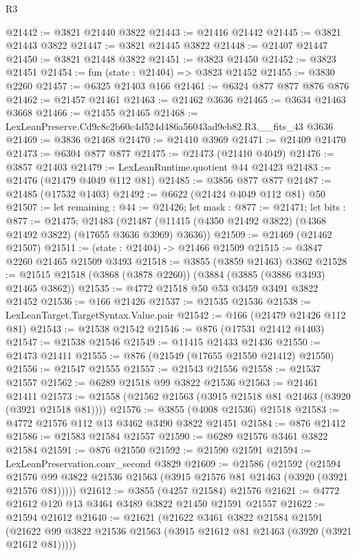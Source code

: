 \begin{lexlean}{R3}
\begin{coremodule}
@21442 := @3821 @21440 @3822
@21443 := @21416 @21442
@21445 := @3821 @21443 @3822
@21447 := @3821 @21445 @3822
@21448 := @21407 @21447
@21450 := @3821 @21448 @3822
@21451 := @3823 @21450
@21452 := @3823 @21451
@21454 := fun (state : @21404) => @3823 @21452
@21455 := @3830 @2260
@21457 := @6325 @21403 @166
@21461 := @6324 @877 @877 @876 @876
@21462 := @21457 @21461
@21463 := @21462 @3636
@21465 := @3634 @21463 @3668
@21466 := @21455 @21465
@21468 := LexLeanPreserve.Cd9c8c2b60c4d524d486a56043ad9eb82.R3.__fits_43 @3636
@21469 := @3836 @21468
@21470 := @21410 @3969
@21471 := @21409 @21470
@21473 := @6304 @877 @877
@21475 := @21473 (@21410 @4049)
@21476 := @3857 @21403
@21479 := LexLeanRuntime.quotient @44 @21423
@21483 := @21476 (@21479 @4049 @112 @81)
@21485 := @3856 @877 @877
@21487 := @21485 (@17532 @1403)
@21492 := @6622 (@21424 @4049 @112 @81) @50
@21507 := let remaining : @44 := @21426;
  let mask : @877 := @21471;
  let bits : @877 := @21475;
  @21483 (@21487 (@11415 (@4350 @21492 @3822) (@4368 @21492 @3822) (@17655 @3636 @3969) @3636))
@21509 := @21469 (@21462 @21507)
@21511 := (state : @21404) -> @21466 @21509
@21515 := @3847 @2260 @21465 @21509 @3493
@21518 := @3855 (@3859 @21463) @3862
@21528 := @21515 @21518 (@3868 (@3878 @2260)) (@3884 (@3885 (@3886 @3493) @21465 @3862))
@21535 := @4772 @21518 @50 @53 @3459 @3491 @3822 @21452
@21536 := @166 @21426
@21537 := @21535 @21536
@21538 := LexLeanTarget.TargetSyntax.Value.pair
@21542 := @166 (@21479 @21426 @112 @81)
@21543 := @21538 @21542
@21546 := @876 (@17531 @21412 @1403)
@21547 := @21538 @21546
@21549 := @11415 @21433 @21436
@21550 := @21473 @21411
@21555 := @876 (@21549 (@17655 @21550 @21412) @21550)
@21556 := @21547 @21555
@21557 := @21543 @21556
@21558 := @21537 @21557
@21562 := @6289 @21518 @99 @3822 @21536
@21563 := @21461 @21411
@21573 := @21558 (@21562 @21563 (@3915 @21518 @81 @21463 (@3920 (@3921 @21518 @81))))
@21576 := @3855 (@4008 @21536) @21518
@21583 := @4772 @21576 @112 @13 @3462 @3490 @3822 @21451
@21584 := @876 @21412
@21586 := @21583 @21584 @21557
@21590 := @6289 @21576 @3461 @3822 @21584
@21591 := @876 @21550
@21592 := @21590 @21591
@21594 := LexLeanPreservation.conv_second @3829
@21609 := @21586
    (@21592
      (@21594 @21576 @99 @3822 @21536 @21563 (@3915 @21576 @81 @21463 (@3920 (@3921 @21576 @81)))))
@21612 := @3855 (@4257 @21584) @21576
@21621 := @4772 @21612 @120 @13 @3464 @3489 @3822 @21450 @21591 @21557
@21622 := @21594 @21612
@21640 := @21621
    (@21622
      @3461
      @3822
      @21584
      @21591
      (@21622 @99 @3822 @21536 @21563 (@3915 @21612 @81 @21463 (@3920 (@3921 @21612 @81)))))

\end{coremodule}
\end{lexlean}
